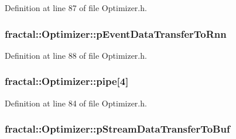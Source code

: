 Definition at line 87 of file Optimizer.\+h.

\hypertarget{classfractal_1_1Optimizer_aadca2e0d88dd1aad36653938b0376e0d}{
\subsubsection[{p\+Event\+Data\+Transfer\+To\+Rnn}]{ fractal\+::\+Optimizer\+::p\+Event\+Data\+Transfer\+To\+Rnn\hspace{0.3cm}{\ttfamily [protected]}}}\label{classfractal_1_1Optimizer_aadca2e0d88dd1aad36653938b0376e0d}


Definition at line 88 of file Optimizer.\+h.

\hypertarget{classfractal_1_1Optimizer_ab10adad03dfda986596f93ce68ce8b9f}{
\subsubsection[{pipe}]{ fractal\+::\+Optimizer\+::pipe\mbox{[}4\mbox{]}\hspace{0.3cm}{\ttfamily [protected]}}}\label{classfractal_1_1Optimizer_ab10adad03dfda986596f93ce68ce8b9f}


Definition at line 84 of file Optimizer.\+h.

\hypertarget{classfractal_1_1Optimizer_a9108d6e52cded35a910a643b868cb3d5}{
\subsubsection[{p\+Stream\+Data\+Transfer\+To\+Buf}]{ fractal\+::\+Optimizer\+::p\+Stream\+Data\+Transfer\+To\+Buf\hspace{0.3cm}{\ttfamily [protected]}}}\label{classfractal_1_1Optimizer_a9108d6e52cded35a910a643b868cb3d5}



